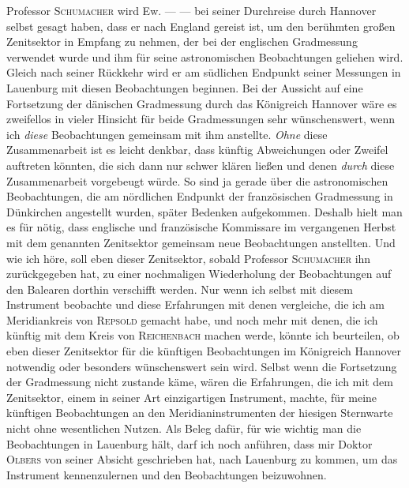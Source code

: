 Professor \textsc{Schumacher} wird Ew. — — bei seiner Durchreise durch Hannover selbst gesagt haben, dass er nach England gereist ist, um den berühmten großen Zenitsektor in Empfang zu nehmen, der bei der englischen Gradmessung verwendet wurde und ihm für seine astronomischen Beobachtungen geliehen wird. Gleich nach seiner Rückkehr wird er am südlichen Endpunkt seiner Messungen in Lauenburg mit diesen Beobachtungen beginnen. Bei der Aussicht auf eine Fortsetzung der dänischen Gradmessung durch das Königreich Hannover wäre es zweifellos in vieler Hinsicht für beide Gradmessungen sehr wünschenswert, wenn ich \textit{diese} Beobachtungen gemeinsam mit ihm anstellte. \textit{Ohne} diese Zusammenarbeit ist es leicht denkbar, dass künftig Abweichungen oder Zweifel auftreten könnten, die sich dann nur schwer klären ließen und denen \textit{durch} diese Zusammenarbeit vorgebeugt würde. So sind ja gerade über die astronomischen Beobachtungen, die am nördlichen Endpunkt der französischen Gradmessung in Dünkirchen angestellt wurden, später Bedenken aufgekommen. Deshalb hielt man es für nötig, dass englische und französische Kommissare im vergangenen Herbst mit dem genannten Zenitsektor gemeinsam neue Beobachtungen anstellten. Und wie ich höre, soll eben dieser Zenitsektor, sobald Professor \textsc{Schumacher} ihn zurückgegeben hat, zu einer nochmaligen Wiederholung der Beobachtungen auf den Balearen dorthin verschifft werden. Nur wenn ich selbst mit diesem Instrument beobachte und diese Erfahrungen mit denen vergleiche, die ich am Meridiankreis von \textsc{Repsold} gemacht habe, und noch mehr mit denen, die ich künftig mit dem Kreis von \textsc{Reichenbach} machen werde, könnte ich beurteilen, ob eben dieser Zenitsektor für die künftigen Beobachtungen im Königreich Hannover notwendig oder besonders wünschenswert sein wird. Selbst wenn die Fortsetzung der Gradmessung nicht zustande käme, wären die Erfahrungen, die ich mit dem Zenitsektor, einem in seiner Art einzigartigen Instrument, machte, für meine künftigen Beobachtungen an den Meridianinstrumenten der hiesigen Sternwarte nicht ohne wesentlichen Nutzen. Als Beleg dafür, für wie wichtig man die Beobachtungen in Lauenburg hält, darf ich noch anführen, dass mir Doktor \textsc{Olbers} von seiner Absicht geschrieben hat, nach Lauenburg zu kommen, um das Instrument kennenzulernen und den Beobachtungen beizuwohnen.
